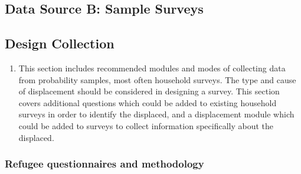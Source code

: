 \documentclass[
]{article}
\providecommand{\tightlist}{%
  \setlength{\itemsep}{0pt}\setlength{\parskip}{0pt}}
\begin{document}
\hypertarget{data-source-b-sample-surveys}{%
\subsection{Data Source B: Sample Surveys}\label{data-source-b-sample-surveys}}

\hypertarget{design-collection-1}{%
\subsection{Design Collection}\label{design-collection-1}}

\begin{enumerate}
\def\labelenumi{\arabic{enumi}.}
\setcounter{enumi}{120}
\tightlist
\item
  This section includes recommended modules and modes of collecting
  data from probability samples, most often household surveys. The
  type and cause of displacement should be considered in designing a
  survey. This section covers additional questions which could be
  added to existing household surveys in order to identify the
  displaced, and a displacement module which could be added to surveys
  to collect information specifically about the displaced.
\end{enumerate}

\hypertarget{b.1.-refugee-questionnaires-and-methodology}{%
\subsubsection{Refugee questionnaires and methodology}\label{b.1.-refugee-questionnaires-and-methodology}}
\end{document}
